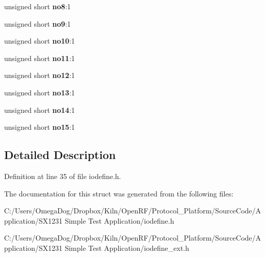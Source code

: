 \begin{DoxyCompactItemize}
\item 
\hypertarget{struct_____b_i_t_s16_a28403f6afecf225e0178a48139118883}{unsigned short {\bfseries no8}\-:1}\label{struct_____b_i_t_s16_a28403f6afecf225e0178a48139118883}

\item 
\hypertarget{struct_____b_i_t_s16_a23a1d0499d6c2ab2961c9e1d23c9201c}{unsigned short {\bfseries no9}\-:1}\label{struct_____b_i_t_s16_a23a1d0499d6c2ab2961c9e1d23c9201c}

\item 
\hypertarget{struct_____b_i_t_s16_af548517818236872aa77d0e11d3f101f}{unsigned short {\bfseries no10}\-:1}\label{struct_____b_i_t_s16_af548517818236872aa77d0e11d3f101f}

\item 
\hypertarget{struct_____b_i_t_s16_ad6c8aa103cd7043b7ba93d11b0654d03}{unsigned short {\bfseries no11}\-:1}\label{struct_____b_i_t_s16_ad6c8aa103cd7043b7ba93d11b0654d03}

\item 
\hypertarget{struct_____b_i_t_s16_a8bf5b94c8d2f21ec271bcdc9f652e7d6}{unsigned short {\bfseries no12}\-:1}\label{struct_____b_i_t_s16_a8bf5b94c8d2f21ec271bcdc9f652e7d6}

\item 
\hypertarget{struct_____b_i_t_s16_a9a98fb967c1148c967977b47e10d7f3b}{unsigned short {\bfseries no13}\-:1}\label{struct_____b_i_t_s16_a9a98fb967c1148c967977b47e10d7f3b}

\item 
\hypertarget{struct_____b_i_t_s16_a1590143d96c3402a4f7af179be7926ce}{unsigned short {\bfseries no14}\-:1}\label{struct_____b_i_t_s16_a1590143d96c3402a4f7af179be7926ce}

\item 
\hypertarget{struct_____b_i_t_s16_a60d23e94450d885f2b5fa032cc6131fd}{unsigned short {\bfseries no15}\-:1}\label{struct_____b_i_t_s16_a60d23e94450d885f2b5fa032cc6131fd}

\end{DoxyCompactItemize}


\subsection{Detailed Description}


Definition at line 35 of file iodefine.\-h.



The documentation for this struct was generated from the following files\-:\begin{DoxyCompactItemize}
\item 
C\-:/\-Users/\-Omega\-Dog/\-Dropbox/\-Kiln/\-Open\-R\-F/\-Protocol\-\_\-\-Platform/\-Source\-Code/\-Application/\-S\-X1231 Simple Test Application/iodefine.\-h\item 
C\-:/\-Users/\-Omega\-Dog/\-Dropbox/\-Kiln/\-Open\-R\-F/\-Protocol\-\_\-\-Platform/\-Source\-Code/\-Application/\-S\-X1231 Simple Test Application/iodefine\-\_\-ext.\-h\end{DoxyCompactItemize}
